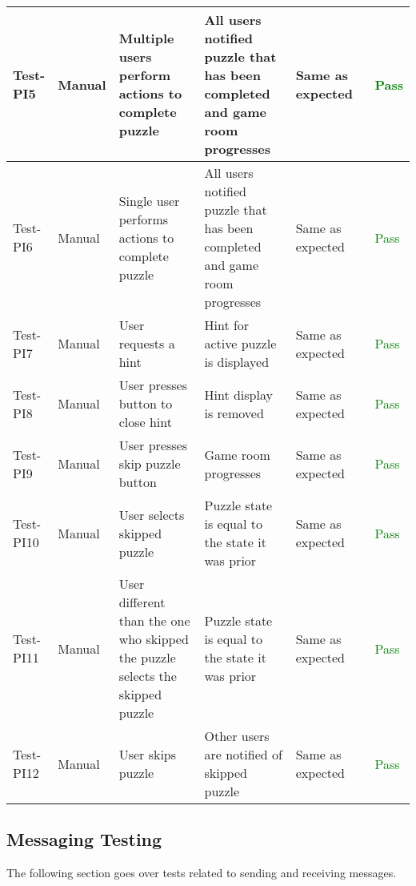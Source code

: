\documentclass[12pt, titlepage]{article}
\begin{document}
\begin{table}[H]
{\begin{tabular}{|l|p{0.15\linewidth}|p{0.3\linewidth}|p{0.3\linewidth}|p{0.3\linewidth}|p{0.1\linewidth}|}
Test-PI5 & Manual & Multiple users perform actions to complete puzzle & All users notified puzzle that has been completed and game room progresses &  Same as expected& \textcolor{Green}{Pass} \\
\hline
Test-PI6 & Manual & Single user performs actions to complete puzzle & All users notified puzzle that has been completed and game room progresses & Same as expected & \textcolor{Green}{Pass} \\
\hline
Test-PI7 & Manual & User requests a hint & Hint for active puzzle is displayed & Same as expected & \textcolor{Green}{Pass} \\
\hline
Test-PI8 & Manual & User presses button to close hint & Hint display is removed & Same as expected & \textcolor{Green}{Pass} \\
\hline
Test-PI9 & Manual & User presses skip puzzle button & Game room progresses & Same as expected & \textcolor{Green}{Pass} \\
\hline
Test-PI10 & Manual & User selects skipped puzzle & Puzzle state is equal to the state it was prior & Same as expected & \textcolor{Green}{Pass} \\
\hline
Test-PI11 & Manual & User different than the one who skipped the puzzle selects the skipped puzzle & Puzzle state is equal to the state it was prior & Same as expected & \textcolor{Green}{Pass} \\
\hline
Test-PI12 & Manual & User skips puzzle & Other users are notified of skipped puzzle & Same as expected & \textcolor{Green}{Pass} \\
\hline
\end{tabular}}
\label{table:PI1}
\end{table}

\subsection{Messaging Testing}
The following section goes over tests related to sending and receiving messages. 
\end{document}

